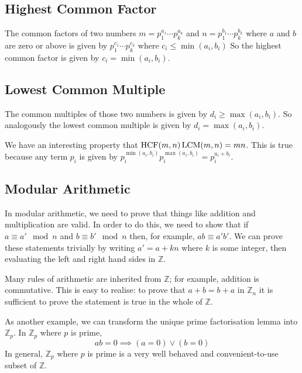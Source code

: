 \subsection{Highest Common Factor}
The common factors of two numbers \(m = p_1^{a_1} \cdots p_k^{a_k}\) and \(n = p_1^{b_1} \cdots p_k^{b_k}\) where \(a\) and \(b\) are zero or above is given by \(p_1^{c_1} \cdots p_k^{c_k}\) where \(c_i \leq \min(a_i, b_i)\) So the highest common factor is given by \(c_i = \min(a_i, b_i)\).

\subsection{Lowest Common Multiple}
The common multiples of those two numbers is given by \(d_i \geq \max(a_i, b_i)\).
So analogously the lowest common multiple is given by \(d_i = \max(a_i, b_i)\).

We have an interesting property that \(\operatorname{HCF}(m, n) \operatorname{LCM}(m, n) = mn\).
This is true because any term \(p_i\) is given by \(p_i^{\min(a_i, b_i)}p_i^{\max(a_i, b_i)} = p_i^{a_i + b_i}\).

\subsection{Modular Arithmetic}
In modular arithmetic, we need to prove that things like addition and multiplication are valid.
In order to do this, we need to show that if \(a \equiv a' \mod n\) and \(b \equiv b' \mod n\) then, for example, \(ab \equiv a'b'\).
We can prove these statements trivially by writing \(a' = a + kn\) where \(k\) is some integer, then evaluating the left and right hand sides in \(\mathbb Z\).

Many rules of arithmetic are inherited from \(\mathbb Z\); for example, addition is commutative.
This is easy to realise: to prove that \(a + b = b + a\) in \(\mathbb Z_n\) it is sufficient to prove the statement is true in the whole of \(\mathbb Z\).

As another example, we can transform the unique prime factorisation lemma into \(\mathbb Z_p\).
In \(\mathbb Z_p\) where \(p\) is prime,
\[
	ab = 0 \implies (a = 0) \lor (b = 0)
\]
In general, \(\mathbb Z_p\) where \(p\) is prime is a very well behaved and convenient-to-use subset of \(\mathbb Z\).

